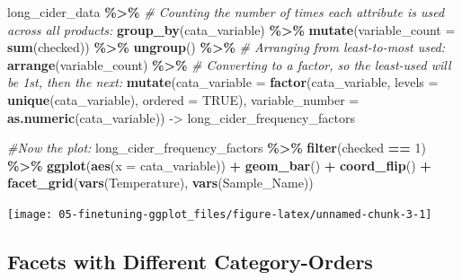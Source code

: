 \documentclass[
]{book}
\newenvironment{Shaded}{\begin{snugshade}}{\end{snugshade}}
\newcommand{\AttributeTok}[1]{\textcolor[rgb]{0.13,0.29,0.53}{#1}}
\newcommand{\CommentTok}[1]{\textcolor[rgb]{0.56,0.35,0.01}{\textit{#1}}}
\newcommand{\ConstantTok}[1]{\textcolor[rgb]{0.56,0.35,0.01}{#1}}
\newcommand{\DecValTok}[1]{\textcolor[rgb]{0.00,0.00,0.81}{#1}}
\newcommand{\FunctionTok}[1]{\textcolor[rgb]{0.13,0.29,0.53}{\textbf{#1}}}
\newcommand{\NormalTok}[1]{#1}
\newcommand{\OtherTok}[1]{\textcolor[rgb]{0.56,0.35,0.01}{#1}}
\newcommand{\SpecialCharTok}[1]{\textcolor[rgb]{0.81,0.36,0.00}{\textbf{#1}}}
\begin{document}
\begin{Shaded}
\begin{Highlighting}[]
\NormalTok{long\_cider\_data }\SpecialCharTok{\%\textgreater{}\%}
  \CommentTok{\# Counting the number of times each attribute is used across all products:}
  \FunctionTok{group\_by}\NormalTok{(cata\_variable) }\SpecialCharTok{\%\textgreater{}\%}
  \FunctionTok{mutate}\NormalTok{(}\AttributeTok{variable\_count =} \FunctionTok{sum}\NormalTok{(checked)) }\SpecialCharTok{\%\textgreater{}\%}
  \FunctionTok{ungroup}\NormalTok{() }\SpecialCharTok{\%\textgreater{}\%}
  \CommentTok{\# Arranging from least{-}to{-}most used:}
  \FunctionTok{arrange}\NormalTok{(variable\_count) }\SpecialCharTok{\%\textgreater{}\%}
  \CommentTok{\# Converting to a factor, so the least{-}used will be 1st, then the next:}
  \FunctionTok{mutate}\NormalTok{(}\AttributeTok{cata\_variable =} \FunctionTok{factor}\NormalTok{(cata\_variable, }\AttributeTok{levels =} \FunctionTok{unique}\NormalTok{(cata\_variable),}
                            \AttributeTok{ordered =} \ConstantTok{TRUE}\NormalTok{),}
         \AttributeTok{variable\_number =} \FunctionTok{as.numeric}\NormalTok{(cata\_variable)) }\OtherTok{{-}\textgreater{}}\NormalTok{ long\_cider\_frequency\_factors}

\CommentTok{\#Now the plot:}
\NormalTok{long\_cider\_frequency\_factors }\SpecialCharTok{\%\textgreater{}\%}
  \FunctionTok{filter}\NormalTok{(checked }\SpecialCharTok{==} \DecValTok{1}\NormalTok{) }\SpecialCharTok{\%\textgreater{}\%}
  \FunctionTok{ggplot}\NormalTok{(}\FunctionTok{aes}\NormalTok{(}\AttributeTok{x =}\NormalTok{ cata\_variable)) }\SpecialCharTok{+}
  \FunctionTok{geom\_bar}\NormalTok{() }\SpecialCharTok{+}
  \FunctionTok{coord\_flip}\NormalTok{() }\SpecialCharTok{+}
  \FunctionTok{facet\_grid}\NormalTok{(}\FunctionTok{vars}\NormalTok{(Temperature), }\FunctionTok{vars}\NormalTok{(Sample\_Name))}
\end{Highlighting}
\end{Shaded}

\begin{center}\texttt{[image: 05-finetuning-ggplot\_files/figure-latex/unnamed-chunk-3-1]} \end{center}

\hypertarget{facets-with-different-category-orders}{%
\subsection{Facets with Different Category-Orders}\label{facets-with-different-category-orders}}
\end{document}
